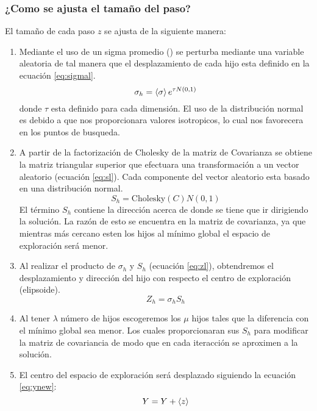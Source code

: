 \subsubsection*{¿Como se ajusta el tamaño del paso?}
El tamaño de cada paso $z$ se ajusta de la siguiente manera:
\begin{enumerate}
    \item Mediante el uso de un sigma promedio (\prom{\sigma}) se perturba mediante una variable aleatoria de tal manera que el desplazamiento de cada hijo esta definido en la ecuación \ref{eq:sigmal}.
          \begin{equation}
              \sigma_h = \left\langle \sigma \right\rangle e^{\tau N(0,1)}
              \label{eq:sigmal}
          \end{equation}
          donde $\tau$ esta definido para cada dimensión. El uso de la distribución normal es debido a que nos proporcionara valores isotropicos, lo cual nos favorecera en los puntos de busqueda.\cite{conference_hansen_2013}
    \item A partir de la factorización de Cholesky de la matriz de Covarianza se obtiene la matriz triangular superior que efectuara una transformación a un vector aleatorio (ecuación \ref{eq:sl}). Cada componente del vector aleatorio esta basado en una distribución normal.
          \begin{equation}
              S_h = \text{Cholesky}(C)N(0,1)
              \label{eq:sl}
          \end{equation}
          El término $S_h$ contiene la dirección acerca de donde se tiene que ir dirigiendo la solución. La razón de esto se encuentra en la matriz de covarianza, ya que mientras más cercano esten los hijos al mínimo global el espacio de exploración será menor.
    \item  Al realizar el producto de $\sigma_h$ y $S_h$ (ecuación \ref{eq:zl}), obtendremos el desplazamiento y dirección del hijo con respecto el centro de exploración (elipsoide).
          \begin{equation}
              Z_h = \sigma_h S_h
              \label{eq:zl}
          \end{equation}
    \item Al tener $\lambda$ número de hijos escogeremos los $\mu$ hijos tales que la diferencia con el mínimo global sea menor. Los cuales proporcionaran sus $S_h$ para modificar la matriz de covariancia de modo que en cada iteracción se aproximen a la solución.
    \item El centro del espacio de exploración será desplazado siguiendo la ecuación \ref{eq:ynew}:
          \begin{equation}
              Y=Y+\left\langle z \right\rangle
              \label{eq:ynew}
          \end{equation}
\end{enumerate}